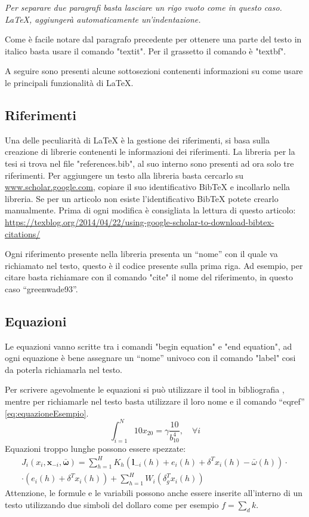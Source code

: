 \documentclass{00-settings/document}
\begin{document}
\textit{Per separare due paragrafi basta lasciare un rigo vuoto come in questo caso. LaTeX, aggiungerà automaticamente un’indentazione.}

Come è facile notare dal paragrafo precedente per ottenere una parte del testo in italico basta usare il comando "textit". Per il grassetto il comando è "textbf".

A seguire sono presenti alcune sottosezioni contenenti informazioni su come usare le principali funzionalità di LaTeX.

\subsection{Riferimenti}
Una delle peculiarità di LaTeX è la gestione dei riferimenti, si basa sulla creazione di librerie contenenti le informazioni dei riferimenti. La libreria per la tesi si trova nel file "references.bib", al suo interno sono presenti ad ora solo tre riferimenti. Per aggiungere un testo alla libreria basta cercarlo su \url{www.scholar.google.com}, copiare il suo identificativo BibTeX e incollarlo nella libreria. Se per un articolo non esiste l’identificativo BibTeX potete crearlo manualmente. Prima di ogni modifica è consigliata la lettura di questo articolo: \url{https://texblog.org/2014/04/22/using-google-scholar-to-download-bibtex-citations/}

Ogni riferimento presente nella libreria presenta un “nome” con il quale va richiamato nel testo, questo è il codice presente sulla prima riga. Ad esempio, per citare \cite{greenwade93} basta richiamare con il comando "cite" il nome del riferimento, in questo caso “greenwade93”.

\subsection{Equazioni}
Le equazioni vanno scritte tra i comandi "begin equation" e "end equation", ad ogni equazione è bene assegnare un “nome” univoco con il comando "label" cosi da poterla richiamarla nel testo.

Per scrivere agevolmente le equazioni si può utilizzare il tool in bibliografia \cite{codecogs}, mentre per richiamarle nel testo basta utilizzare il loro nome e il comando “eqref” \eqref{eq:equazioneEsempio}.
\begin{equation} 
\label{eq:equazioneEsempio}
\int_{i=1}^{N}10x_{20}=\gamma \frac{10}{b_{10}^{4}}, \quad \forall i
\end{equation}
Equazioni troppo lunghe possono essere spezzate:
\begin{multline}
J_i(x_{i},\boldsymbol {x}_{-i} ,\boldsymbol {\bar{\omega}})  =\sum_{h=1}^{H} K_{h} (\boldsymbol l_{-i}(h) + e_i(h) + \delta^{T} x_{i}(h)- \bar{\omega}(h)) \cdot 
\\
 \cdot (e_i(h) +\delta^{T} x_{i}(h))  + \sum_{h=1}^{H} W_{i} (\delta_{g}^{T} x_{i}(h))
\label{eq:equazioneEsempioLunga}
\end{multline}
Attenzione, le formule e le variabili possono anche essere inserite all'interno di un testo utilizzando due simboli del dollaro come per esempio $f = \sum_d k$.
\end{document}

